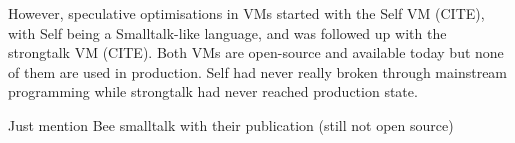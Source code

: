 \documentclass[a4paper,12pt,twoside]{../includes/ThesisStyle}
\begin{document}
However, speculative optimisations in VMs started with the Self VM (CITE), with Self being a Smalltalk-like language, and was followed up with the strongtalk VM (CITE). Both VMs are open-source and available today but none of them are used in production. Self had never really broken through mainstream programming while strongtalk had never reached production state.

Just mention Bee smalltalk with their publication (still not open source)

\ifx\wholebook\relax\else
    
\end{document}
